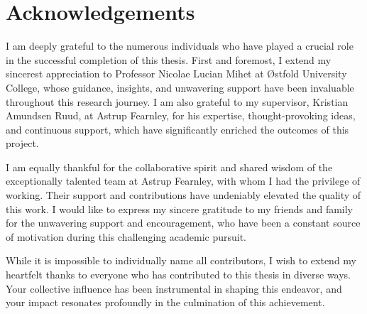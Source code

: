 \chapter*{Acknowledgements}

I am deeply grateful to the numerous individuals who have played a crucial role in the successful completion of this thesis. 
First and foremost, I extend my sincerest appreciation to Professor Nicolae Lucian Mihet at Østfold University College, 
whose guidance, insights, and unwavering support have been invaluable throughout this research journey. 
I am also grateful to my supervisor, Kristian Amundsen Ruud, at Astrup Fearnley, for his expertise, thought-provoking ideas, and continuous support, which have significantly enriched the outcomes of this project.

I am equally thankful for the collaborative spirit and shared wisdom of the exceptionally talented team at Astrup Fearnley, with whom I had the privilege of working. 
Their support and contributions have undeniably elevated the quality of this work. 
I would like to express my sincere gratitude to my friends and family for the unwavering support and encouragement, who have been a constant source of motivation during this challenging academic pursuit.

While it is impossible to individually name all contributors, I wish to extend my heartfelt thanks to everyone who has contributed to this thesis in diverse ways. 
Your collective influence has been instrumental in shaping this endeavor, and your impact resonates profoundly in the culmination of this achievement.
